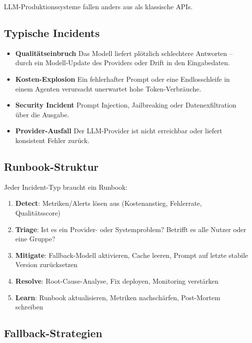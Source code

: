 LLM-Produktionssysteme fallen anders aus als klassische APIs.

\subsection{Typische Incidents}

\begin{itemize}

    \item \textbf{Qualitätseinbruch} Das Modell liefert plötzlich schlechtere Antworten -- durch ein Modell-Update des Providers oder Drift in den Eingabedaten.
    \item \textbf{Kosten-Explosion} Ein fehlerhafter Prompt oder eine Endlosschleife in einem Agenten verursacht unerwartet hohe Token-Verbräuche.
    \item \textbf{Security Incident} Prompt Injection, Jailbreaking oder Datenexfiltration über die Ausgabe.
    \item \textbf{Provider-Ausfall} Der LLM-Provider ist nicht erreichbar oder liefert konsistent Fehler zurück.
\end{itemize}

\subsection{Runbook-Struktur}

Jeder Incident-Typ braucht ein Runbook:

\begin{enumerate}[leftmargin=*]
    \item \textbf{Detect}: Metriken/Alerts lösen aus (Kostenanstieg, Fehlerrate, Qualitätsscore)
    \item \textbf{Triage}: Ist es ein Provider- oder Systemproblem? Betrifft es alle Nutzer oder eine Gruppe?
    \item \textbf{Mitigate}: Fallback-Modell aktivieren, Cache leeren, Prompt auf letzte stabile Version zurücksetzen
    \item \textbf{Resolve}: Root-Cause-Analyse, Fix deployen, Monitoring verstärken
    \item \textbf{Learn}: Runbook aktualisieren, Metriken nachschärfen, Post-Mortem schreiben
\end{enumerate}

\subsection{Fallback-Strategien}

